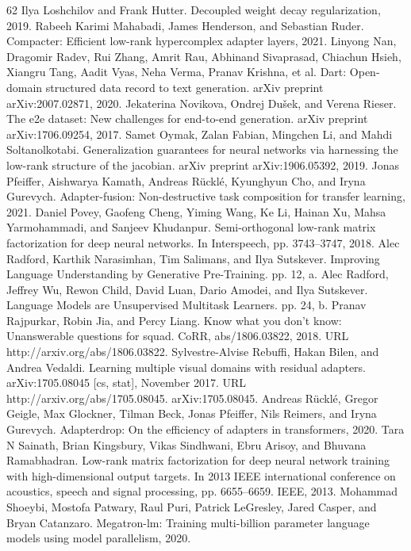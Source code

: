 \documentclass[conference]{IEEEtran}
\begin{document}
\begin{thebibliography}{62}
 Ilya Loshchilov and Frank Hutter. Decoupled weight decay regularization, 2019.
 Rabeeh Karimi Mahabadi, James Henderson, and Sebastian Ruder. Compacter: Efficient low-rank hypercomplex adapter layers, 2021.
 Linyong Nan, Dragomir Radev, Rui Zhang, Amrit Rau, Abhinand Sivaprasad, Chiachun Hsieh, Xiangru Tang, Aadit Vyas, Neha Verma, Pranav Krishna, et al. Dart: Open-domain structured data record to text generation. arXiv preprint arXiv:2007.02871, 2020.
 Jekaterina Novikova, Ondrej Dušek, and Verena Rieser. The e2e dataset: New challenges for end-to-end generation. arXiv preprint arXiv:1706.09254, 2017.
 Samet Oymak, Zalan Fabian, Mingchen Li, and Mahdi Soltanolkotabi. Generalization guarantees for neural networks via harnessing the low-rank structure of the jacobian. arXiv preprint arXiv:1906.05392, 2019.
 Jonas Pfeiffer, Aishwarya Kamath, Andreas Rücklé, Kyunghyun Cho, and Iryna Gurevych. Adapter-fusion: Non-destructive task composition for transfer learning, 2021.
 Daniel Povey, Gaofeng Cheng, Yiming Wang, Ke Li, Hainan Xu, Mahsa Yarmohammadi, and Sanjeev Khudanpur. Semi-orthogonal low-rank matrix factorization for deep neural networks. In Interspeech, pp. 3743–3747, 2018.
 Alec Radford, Karthik Narasimhan, Tim Salimans, and Ilya Sutskever. Improving Language Understanding by Generative Pre-Training. pp. 12, a.
 Alec Radford, Jeffrey Wu, Rewon Child, David Luan, Dario Amodei, and Ilya Sutskever. Language Models are Unsupervised Multitask Learners. pp. 24, b.
 Pranav Rajpurkar, Robin Jia, and Percy Liang. Know what you don’t know: Unanswerable questions for squad. CoRR, abs/1806.03822, 2018. URL http://arxiv.org/abs/1806.03822.
 Sylvestre-Alvise Rebuffi, Hakan Bilen, and Andrea Vedaldi. Learning multiple visual domains with residual adapters. arXiv:1705.08045 [cs, stat], November 2017. URL http://arxiv.org/abs/1705.08045. arXiv:1705.08045.
 Andreas Rücklé, Gregor Geigle, Max Glockner, Tilman Beck, Jonas Pfeiffer, Nils Reimers, and Iryna Gurevych. Adapterdrop: On the efficiency of adapters in transformers, 2020.
 Tara N Sainath, Brian Kingsbury, Vikas Sindhwani, Ebru Arisoy, and Bhuvana Ramabhadran. Low-rank matrix factorization for deep neural network training with high-dimensional output targets. In 2013 IEEE international conference on acoustics, speech and signal processing, pp. 6655–6659. IEEE, 2013.
 Mohammad Shoeybi, Mostofa Patwary, Raul Puri, Patrick LeGresley, Jared Casper, and Bryan Catanzaro. Megatron-lm: Training multi-billion parameter language models using model parallelism, 2020.

\end{thebibliography}
\end{document}
